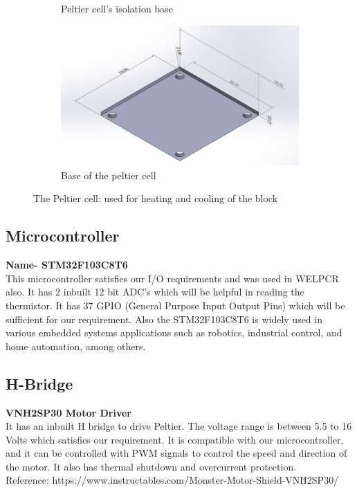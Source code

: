\documentclass{article}
\begin{document}
\begin{figure}[htp]
\begin{subfigure}[b]{0.3\textwidth}
        \caption{Peltier cell's isolation base}
    \end{subfigure}
    \hfill
    \begin{subfigure}[b]{0.3\textwidth}
        \centering
        \includegraphics[width=\textwidth, height= 0.8\textwidth]{Images/peltierbase.jpeg}
        \caption{Base of the peltier cell}
    \end{subfigure}
    \caption{The Peltier cell: used for heating and cooling of the block}
    \label{fig:galaxy}
\end{figure}


\subsection{Microcontroller}
\textbf{Name- STM32F103C8T6}\\
This microcontroller satisfies our I/O requirements and was used in WELPCR also. It has 2 inbuilt 12 bit ADC's which will be helpful in reading the thermistor. It has 37 GPIO (General Purpose Input Output Pins) which will be sufficient for our requirement. Also the STM32F103C8T6 is widely used in various embedded systems applications such as robotics, industrial control, and home automation, among others.

\subsection{H-Bridge}
\textbf{VNH2SP30 Motor Driver}\\
It has an inbuilt H bridge to drive Peltier. The voltage range is between 5.5 to 16 Volts which satisfies our requirement. It is compatible with our microcontroller, and it can be controlled with PWM signals to control the speed and direction of the motor. It also has thermal shutdown and overcurrent protection.\\
Reference: https://www.instructables.com/Monster-Motor-Shield-VNH2SP30/
\end{document}
